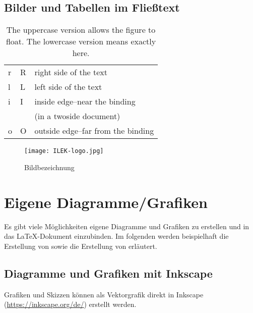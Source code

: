 \newpage

\subsection{Bilder und Tabellen im Fließtext}

\begin{wraptable}[]{o}[0cm]{9cm}
	\begin{center}
		\begin{tabular}{|l|l|l|}
			\hline
			r & R & right side of the text\\
			l & L & left side of the text\\
			i & I & inside edge–near the binding\\
			& &  (in a twoside document)\\
			o & O & outside edge–far from the binding\\
			\hline
		\end{tabular}
	\end{center}
	\caption{The uppercase version allows the figure to float. The lowercase version means exactly here.}%
\end{wraptable}

\blindtext[2]

\begin{wrapfigure}[]{o}[0cm]{6.5cm}
	\texttt{[image: ILEK-logo.jpg]}
	\caption{Bildbezeichnung}
	\label{fig:05_bild}
\end{wrapfigure}

\blindtext[2]

\newpage

\section{Eigene Diagramme/Grafiken}

Es gibt viele Möglichkeiten eigene Diagramme und Grafiken zu erstellen und in das \LaTeX-Dokument einzubinden. Im folgenden werden beispielhaft die Erstellung von  sowie die Erstellung von  erläutert.

\subsection{Diagramme und Grafiken mit Inkscape}
\label{subsec:python_inkscape}

Grafiken und Skizzen können als Vektorgrafik direkt in Inkscape (\url{https://inkscape.org/de/}) erstellt werden.

